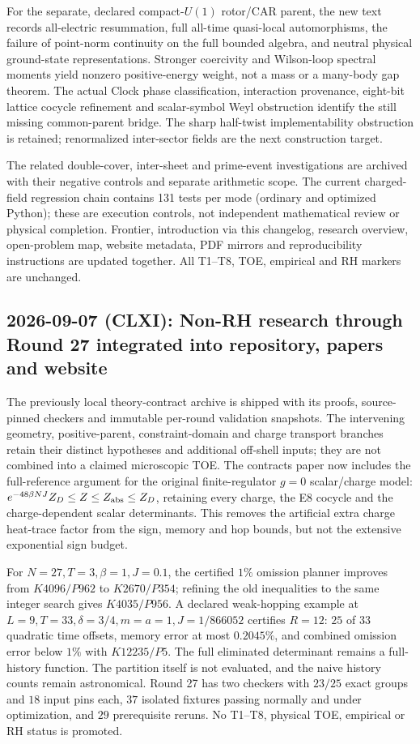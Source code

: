 For the separate, declared compact-$U(1)$ rotor/CAR parent, the new text
records all-electric resummation, full all-time quasi-local automorphisms,
the failure of point-norm continuity on the full bounded algebra, and
neutral physical ground-state representations. Stronger coercivity and
Wilson-loop spectral moments yield nonzero positive-energy weight, not
a mass or a many-body gap theorem. The actual Clock phase classification,
interaction provenance, eight-bit lattice cocycle refinement and
scalar-symbol Weyl obstruction identify the still missing common-parent
bridge. The sharp half-twist implementability obstruction is retained;
renormalized inter-sector fields are the next construction target.

The related double-cover, inter-sheet and prime-event investigations are
archived with their negative controls and separate arithmetic scope.
The current charged-field regression chain contains 131 tests per mode
(ordinary and optimized Python); these are execution controls, not
independent mathematical review or physical completion. Frontier,
introduction via this changelog, research overview, open-problem map,
website metadata, PDF mirrors and reproducibility instructions are
updated together. All T1--T8, TOE, empirical and RH markers are unchanged.

\subsection*{2026-09-07 (CLXI): Non-RH research through Round 27 integrated into repository, papers and website}
The previously local theory-contract archive is shipped with its proofs,
source-pinned checkers and immutable per-round validation snapshots.
The intervening geometry, positive-parent, constraint-domain and charge
transport branches retain their distinct hypotheses and additional
off-shell inputs; they are not combined into a claimed microscopic TOE.
The contracts paper now includes the full-reference argument for the
original finite-regulator $g=0$ scalar/charge model:
$e^{-48\beta NJ}Z_D\le Z\le Z_{\rm abs}\le Z_D$, retaining every charge,
the E8 cocycle and the charge-dependent scalar determinants. This removes
the artificial extra charge heat-trace factor from the sign, memory and
hop bounds, but not the extensive exponential sign budget.

For $N=27,T=3,\beta=1,J=0.1$, the certified $1\%$ omission planner improves
from $K4096/P962$ to $K2670/P354$; refining the old inequalities to the same
integer search gives $K4035/P956$. A declared weak-hopping example at
$L=9,T=33,\delta=3/4,m=a=1,J=1/866052$ certifies $R=12$: $25$ of $33$
quadratic time offsets, memory error at most $0.2045\%$, and combined
omission error below $1\%$ with $K12235/P5$. The full eliminated determinant
remains a full-history function. The partition itself is not evaluated,
and the naive history counts remain astronomical. Round 27 has two checkers
with $23/25$ exact groups and $18$ input pins each, $37$ isolated fixtures
passing normally and under optimization, and $29$ prerequisite reruns.
No T1--T8, physical TOE, empirical or RH status is promoted.

